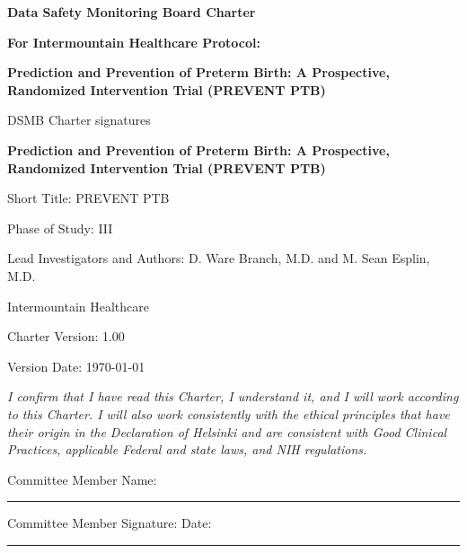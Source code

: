 \documentclass[12pt]{article}
\def\protname{Prediction and Prevention of Preterm Birth: A Prospective, Randomized Intervention Trial (PREVENT PTB)}%
\def\protacronym{PREVENT PTB }
\def\charterversion{1.00}%
\renewcommand{\title}[1]{\begin{center}{\bf\Huge{#1}}\end{center}}
\begin{document}
\clearpage{}
\thispagestyle{plain}
\title{Data Safety Monitoring Board Charter}

\vspace{1cm}

\begin{center}
\begin{Large}
\textbf{For Intermountain Healthcare Protocol:}
 
\vspace{1cm}

\textbf{\protname}

\end{Large}
\end{center}

\newpage

\begin{center}
DSMB Charter signatures


\textbf{\protname}

\vspace{0.5cm}

Short Title: \protacronym

Phase of Study: III

Lead Investigators and Authors: D. Ware Branch, M.D. and M. Sean Esplin, M.D.

Intermountain Healthcare

\vspace{0.5cm}

Charter Version: \charterversion

Version Date: \today

\end{center}
\vspace{1cm}

\noindent \textit{I confirm that I have read this Charter, I understand it, 
and I will work according to this Charter. I will also work consistently 
with the ethical principles that have their origin in the Declaration of 
Helsinki and are consistent with Good Clinical Practices, applicable Federal 
and state laws, and NIH regulations.}
\vspace{0.5cm}

\noindent Committee Member Name: 

\vspace{0.7cm}
\noindent\rule{16cm}{0.4pt}

\vspace{0.4cm}
\noindent Committee Member Signature:             Date: 

\vspace{0.7cm}
\noindent\rule{16cm}{0.4pt}
\end{document}
